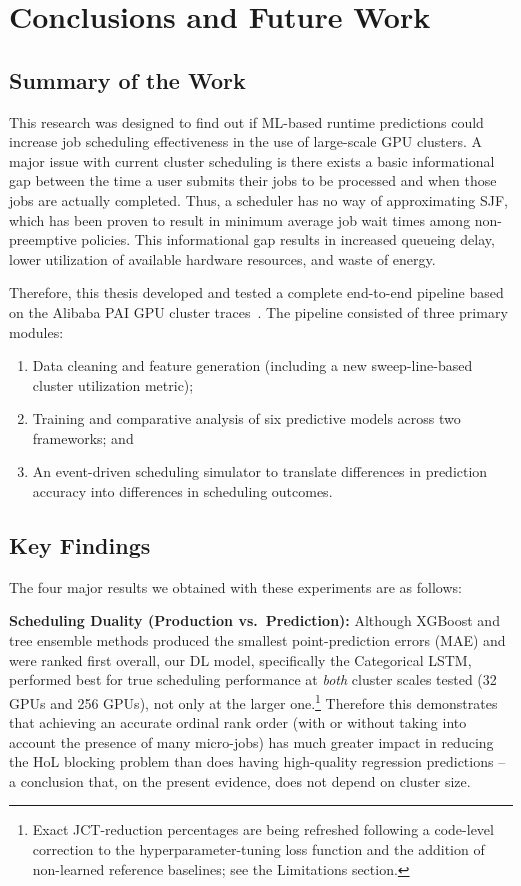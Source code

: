 \chapter{Conclusions and Future Work}\label{chp:conclusion}

\section{Summary of the Work}

This research was designed to find out if ML-based runtime predictions could increase job scheduling effectiveness in the use of large-scale GPU clusters. A major issue with current cluster scheduling is there exists a basic informational gap between the time a user submits their jobs to be processed and when those jobs are actually completed. Thus, a scheduler has no way of approximating SJF, which has been proven to result in minimum average job wait times among non-preemptive policies. This informational gap results in increased queueing delay, lower utilization of available hardware resources, and waste of energy.

Therefore, this thesis developed and tested a complete end-to-end pipeline based on the Alibaba PAI GPU cluster traces~\cite{weng2022mlaas}. The pipeline consisted of three primary modules:
\begin{enumerate}
    \item Data cleaning and feature generation (including a new sweep-line-based cluster utilization metric);
    \item Training and comparative analysis of six predictive models across two frameworks; and
    \item An event-driven scheduling simulator to translate differences in prediction accuracy into differences in scheduling outcomes.
\end{enumerate}

\section{Key Findings}

The four major results we obtained with these experiments are as follows:

\textbf{Scheduling Duality (Production vs.\ Prediction):} Although XGBoost and tree ensemble methods produced the smallest point-prediction errors (MAE) and were ranked first overall, our DL model, specifically the Categorical LSTM, performed best for true scheduling performance at \emph{both} cluster scales tested (32 GPUs and 256 GPUs), not only at the larger one.\footnote{Exact JCT-reduction percentages are being refreshed following a code-level correction to the hyperparameter-tuning loss function and the addition of non-learned reference baselines; see the Limitations section.} Therefore this demonstrates that achieving an accurate ordinal rank order (with or without taking into account the presence of many micro-jobs) has much greater impact in reducing the HoL blocking problem than does having high-quality regression predictions -- a conclusion that, on the present evidence, does not depend on cluster size.

